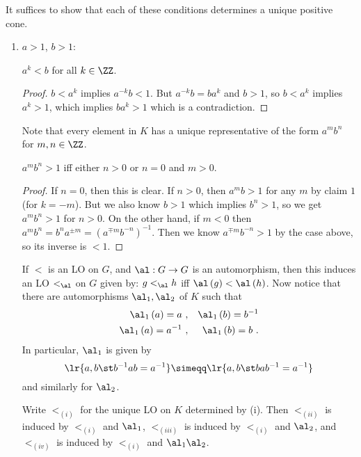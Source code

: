 \begin{Proof}
It suffices to show that each of these conditions determines a unique positive cone.
\begin{enumerate}[label = (\iii)]
\item $a> 1$, $b > 1$: 
\begin{clm}
$a^k < b$ for all $k\in \ZZ$.
\end{clm}
\begin{proof}
$b < a^k$ implies $a^{-k}b < 1$. But $a^{-k} b = ba^k$ and $b > 1$, so $b < a^k$ implies
$a^k>1$, which implies $ba^k > 1$ which is a contradiction.
\end{proof}
Note that every element in $K$ has a unique representative of the form $a^m b^n$
for $m,n\in \ZZ$.
\begin{clm}
$a^m b^n > 1$ iff either $n > 0$ or $n =0$ and $m > 0$.
\end{clm}
\begin{proof}
If $n = 0$, then this is clear. If $n > 0$, then $a^m b > 1$ for any $m$ by claim $1$ (for
$k = -m$). But we also know $b > 1$ which implies $b^n > 1$, so we get $a^m b^n > 1$ for
$n > 0$. On the other hand, if $m < 0$ then $a^m b^n = b^n a^{\pm m} = \left(a^{\mp m}
b^{-n}\right)^{-1}$. Then we know $a^{\mp m}b^{-n} > 1$ by the case above, so its inverse
is $<1$.
\end{proof}

If $<$ is an LO on $G$, and $\al : G\to G$ is an automorphism, then this induces an LO
$<_\al$ on $G$ given by:
$g <_\al h$ iff $\al\left(g\right) < \al\left(h\right)$.
Now notice that there are automorphisms $\al_1 , \al_2$ of $K$ such that
\begin{align}
\al_1\left(a\right) = a\ , && \al_1\left(b\right) = b^{-1} \\
\al_1\left(a\right) = a^{-1}\ , && \al_1\left(b\right) = b
\ .
\end{align}
In particular, $\al_1$ is given by
\begin{equation}
\lr{a,b \st b^{-1} a b = a^{-1}} \simeqq \lr{a , b \st bab^{-1} = a^{-1}}
\end{equation}
and similarly for $\al_2$.

Write $<_{\left(i\right)}$ for the unique LO on $K$ determined by (i). Then
$<_{\left(ii\right)}$ is induced by $<_{\left(i\right)}$ and $\al_1$,
$<_{\left(iii\right)}$ is induced by $<_{\left(i\right)}$ and $\al_2$,
and $<_{\left(iv\right)}$ is induced by $<_{\left(i\right)}$ and $\al_1 \al_2$.
\end{enumerate}
\end{Proof}

